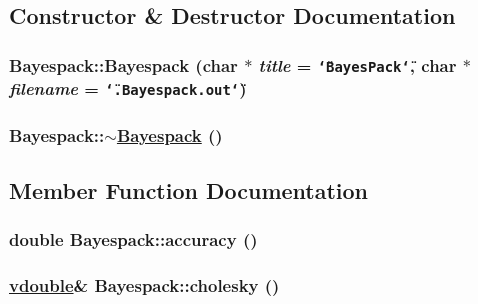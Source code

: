 \subsection{Constructor \& Destructor Documentation}
\hypertarget{classBayespack_a0}{
\subsubsection[Bayespack]{\setlength{\rightskip}{0pt plus 5cm}Bayespack::Bayespack (char $\ast$ {\em title} = {\tt \char`\"{}BayesPack\char`\"{}}, char $\ast$ {\em filename} = {\tt \char`\"{}.Bayespack.out\char`\"{}})}}
\label{classBayespack_a0}


\hypertarget{classBayespack_a1}{
\subsubsection[$\sim$Bayespack]{\setlength{\rightskip}{0pt plus 5cm}Bayespack::$\sim$\hyperlink{classBayespack}{Bayespack} ()}}
\label{classBayespack_a1}




\subsection{Member Function Documentation}
\hypertarget{classBayespack_a7}{
\subsubsection[accuracy]{\setlength{\rightskip}{0pt plus 5cm}double Bayespack::accuracy ()}}
\label{classBayespack_a7}


\hypertarget{classBayespack_a13}{
\subsubsection[cholesky]{\setlength{\rightskip}{0pt plus 5cm}\hyperlink{PoissonGammaFit_8hpp_a0}{vdouble}\& Bayespack::cholesky ()}}
\label{classBayespack_a13}


